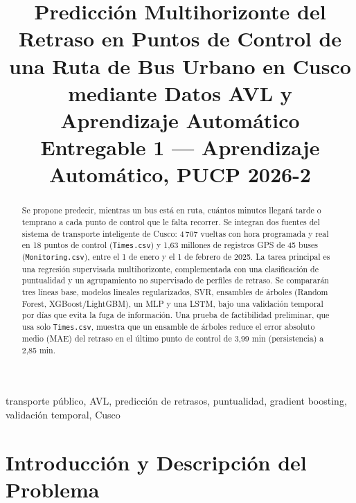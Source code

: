 \documentclass[conference,spanish]{IEEEtran}
\begin{document}
\title{Predicción Multihorizonte del Retraso en Puntos de Control de una Ruta de Bus Urbano en Cusco mediante Datos AVL y Aprendizaje Automático\\
\large Entregable 1 --- Aprendizaje Automático, PUCP 2026-2}

\author{
}

\maketitle

\begin{abstract}
Se propone predecir, mientras un bus está en ruta, cuántos minutos llegará tarde o temprano a cada punto de control que le falta recorrer. Se integran dos fuentes del sistema de transporte inteligente de Cusco: 4\,707 vueltas con hora programada y real en 18 puntos de control (\texttt{Times.csv}) y 1,63 millones de registros GPS de 45 buses (\texttt{Monitoring.csv}), entre el 1 de enero y el 1 de febrero de 2025. La tarea principal es una regresión supervisada multihorizonte, complementada con una clasificación de puntualidad y un agrupamiento no supervisado de perfiles de retraso. Se compararán tres líneas base, modelos lineales regularizados, SVR, ensambles de árboles (Random Forest, XGBoost/LightGBM), un MLP y una LSTM, bajo una validación temporal por días que evita la fuga de información. Una prueba de factibilidad preliminar, que usa solo \texttt{Times.csv}, muestra que un ensamble de árboles reduce el error absoluto medio (MAE) del retraso en el último punto de control de 3,99 min (persistencia) a 2,85 min.
\end{abstract}

\begin{IEEEkeywords}
transporte público, AVL, predicción de retrasos, puntualidad, gradient boosting, validación temporal, Cusco
\end{IEEEkeywords}

\section{Introducción y Descripción del Problema}
\end{document}
